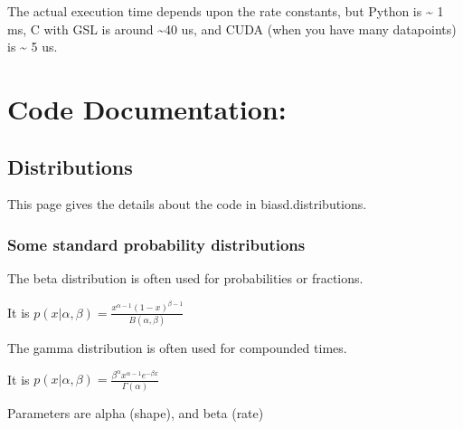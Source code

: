 \documentclass[letterpaper,10pt,english]{sphinxmanual}
\begin{document}
The actual execution time depends upon the rate constants, but Python is \textasciitilde{} 1 ms, C with GSL is around \textasciitilde{}40 us, and CUDA (when you have many datapoints) is \textasciitilde{} 5 us.


\chapter{Code Documentation:}
\label{index:code-documentation}

\section{Distributions}
\label{code_distributions:distributions}\label{code_distributions:code-distributions}\label{code_distributions::doc}
This page gives the details about the code in biasd.distributions.


\subsection{Some standard probability distributions}
\label{code_distributions:some-standard-probability-distributions}\label{code_distributions:module-distributions}

\begin{fulllineitems}
\label{code_distributions:distributions.beta}
The beta distribution is often used for probabilities or fractions.

It is \(p(x\vert\alpha ,\beta) = \frac{ x^{\alpha-1}(1-x)^{\beta-1}}{B(\alpha ,\beta)}\)

\end{fulllineitems}


\begin{fulllineitems}
\label{code_distributions:distributions.gamma}
The gamma distribution is often used for compounded times.

It is \(p(x\vert\alpha ,\beta) = \frac{ \beta^\alpha x^{\alpha - 1} e^{-\beta x} }{\Gamma(\alpha)}\)

Parameters are alpha (shape), and beta (rate)

\end{fulllineitems}
\end{document}
